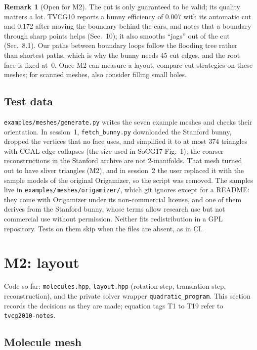\documentclass[11pt]{article}
\theoremstyle{definition}
\newtheorem*{remark}{Remark}
\begin{document}
\begin{remark}[Open for M2]
The cut is only guaranteed to be valid; its quality matters a lot. TVCG10
reports a bunny efficiency of 0.007 with its automatic cut and 0.172 after
moving the boundary behind the ears, and notes that a boundary through sharp
points helps (Sec.~10); it also smooths ``jags'' out of the cut (Sec.~8.1).
Our paths between boundary loops follow the flooding tree rather than
shortest paths, which is why the bunny needs 45 cut edges, and the root face
is fixed at~0. Once M2 can measure a layout, compare cut strategies on these
meshes; for scanned meshes, also consider filling small holes.
\end{remark}

\subsection{Test data}

\texttt{examples/meshes/generate.py} writes the seven example meshes and checks
their orientation. In session~1, \texttt{fetch\_bunny.py} downloaded the
Stanford bunny, dropped the vertices that no face uses, and simplified it to at
most 374 triangles with CGAL edge collapses (the size used in SoCG17 Fig.~1);
the coarser reconstructions in the Stanford archive are not 2-manifolds. That
mesh turned out to have sliver triangles (M2), and in session~2 the user
replaced it with the sample models of the original Origamizer, so the script
was removed. The samples live in \texttt{examples/meshes/origamizer/}, which
git ignores except for a README: they come with Origamizer under its
non-commercial license, and one of them derives from the Stanford bunny, whose
terms allow research use but not commercial use without permission. Neither
fits redistribution in a GPL repository. Tests on them skip when the files are
absent, as in CI.

\section{M2: layout}

Code so far: \texttt{molecules.hpp}, \texttt{layout.hpp} (rotation step,
translation step, reconstruction), and the private solver wrapper
\texttt{quadratic\_program}. This section records the decisions as they are
made; equation tags T1 to T19 refer to \texttt{tvcg2010-notes}.

\subsection{Molecule mesh}
\end{document}
